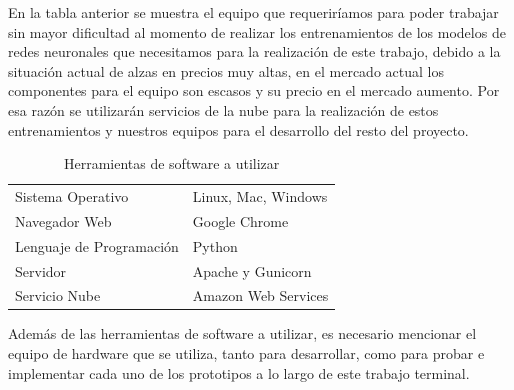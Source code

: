 \documentclass[12pt, a4paper, titlepage]{report}
\begin{document}
    	En la tabla anterior se muestra el equipo que requeriríamos para poder trabajar sin mayor dificultad al momento de realizar los entrenamientos de los modelos de redes neuronales que necesitamos para la realización de este trabajo, debido a la situación actual de alzas en precios muy altas, en el mercado actual los componentes para el equipo son escasos y su precio en el mercado aumento. Por esa razón se utilizarán servicios de la nube para la realización de estos entrenamientos y nuestros equipos para el desarrollo del resto del proyecto.
    	
    	\begin{table}[H]
    		\caption[Herramientas de software a utilizar]{Herramientas de software a utilizar}
    		\begin{tabular}{ |p{3.5cm}|p{9.5cm}|}
    			\hline
    			\rowcolor{guindapoli}
    			\multicolumn{2}{|c|}{\textbf{\textcolor{white}{Herramientas de Software a utilizar}}}\\
    			\hline
    			\cellcolor{azulclaro}Sistema Operativo & 
    			Linux, Mac, Windows \\ 
    			\hline
    			\cellcolor{azulclaro}Navegador Web &
    			Google Chrome\\
    			\hline
    			\cellcolor{azulclaro}Lenguaje de Programación &
    			Python\\
    			\hline
    			\cellcolor{azulclaro}Servidor &
    			Apache y Gunicorn\\
    			\hline
    			\cellcolor{azulclaro}Servicio Nube &
    			Amazon Web Services\\
    			\hline    			
    		\end{tabular}
    	\end{table}
    
    	Además de las herramientas de software a utilizar, es necesario mencionar el equipo de hardware que se utiliza, tanto para desarrollar, como para probar e implementar cada uno de los prototipos a lo largo de este trabajo terminal.
    	
\end{document}
